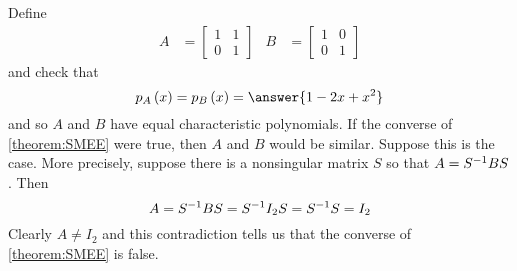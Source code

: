 \documentclass{ximera}
\begin{document}
\begin{example}

Define
\begin{align*}
A&=\begin{bmatrix}1&1\\0&1\end{bmatrix}
&
B&=\begin{bmatrix}1&0\\0&1\end{bmatrix}
\end{align*}
and check that
\[
\charpoly{A}{x}=\charpoly{B}{x}=\answer{1-2x+x^2}
\]
and so $A$ and $B$ have equal characteristic polynomials.  If the
converse of \ref{theorem:SMEE} were true, then $A$ and $B$ would be
similar.  Suppose this is the case. More precisely, suppose there is a
nonsingular matrix $S$ so that $A=S^{-1}BS$. Then
\[
A=S^{-1}BS=S^{-1}I_2S=S^{-1}S=I_2
\]
Clearly $A\neq I_2$ and this contradiction tells us that the converse
of \ref{theorem:SMEE} is false.

\end{example}
\end{document}
